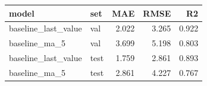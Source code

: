 \begin{tabular}{llrrr}
\toprule
model & set & MAE & RMSE & R2 \\
\midrule
baseline_last_value & val & 2.022 & 3.265 & 0.922 \\
baseline_ma_5 & val & 3.699 & 5.198 & 0.803 \\
baseline_last_value & test & 1.759 & 2.861 & 0.893 \\
baseline_ma_5 & test & 2.861 & 4.227 & 0.767 \\
\bottomrule
\end{tabular}

